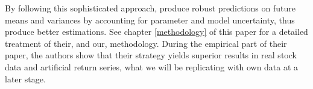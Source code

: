 By following this sophisticated approach, \citeauthor{anderson_cheng_2016} produce robust predictions on future means and variances by accounting for parameter and model uncertainty, thus produce better estimations. See chapter \ref{methodology} of this paper for a detailed treatment of their, and our, methodology. During the empirical part of their paper, the authors show that their strategy yields superior results in real stock data and artificial return series, what we will be replicating with own data at a later stage.
